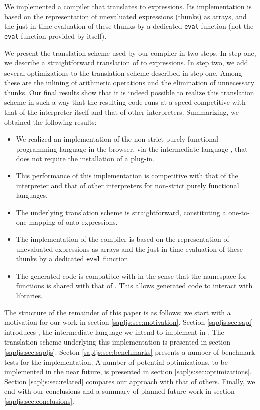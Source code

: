 We implemented a compiler that translates \Sapl to \JS expressions. Its
implementation is based on the representation of unevaluated expressions
(thunks) as \JS arrays, and the just-in-time evaluation of these thunks by a
dedicated \texttt{eval} function (not the \texttt{eval}
function provided by \JS itself).

We present the translation scheme used by our compiler in two steps.
In step one, we describe a straightforward translation of \Sapl to \JS
expressions. In step two, we add several optimizations to the translation
scheme described in step one. Among these are the inlining of arithmetic
operations and the elimination of unnecessary thunks. Our final results show
that it is indeed possible to realize this translation scheme in such a way that
the resulting code runs at a speed competitive with that of the \Sapl
interpreter itself and that of other interpreters. Summarizing, we obtained the
following results:

\begin{itemize}
\item We realized an implementation of the non-strict purely functional
      programming language \Clean in the browser, via the intermediate language       
      \Sapl, that does not require the installation of a plug-in.
\item This performance of this implementation is competitive with that of the
      \Sapl interpreter and that of other interpreters for non-strict purely
      functional languages.
\item The underlying translation scheme is straightforward, constituting a
      one-to-one mapping of \Sapl onto \JS expressions.
\item The implementation of the compiler is based on the representation of
      unevaluated expressions as \JS arrays and the just-in-time evaluation of
      these thunks by a dedicated \texttt{eval} function.
\item The generated code is compatible with \JS in the sense that the namespace
      for functions is shared with that of \JS. This allows generated code to
      interact with \JS libraries.
\end{itemize}
The structure of the remainder of this paper is as follows: we start with a
motivation for our work in section \ref{sapljs:sec:motivation}. Section
\ref{sapljs:sec:sapl} introduces \Sapl, the intermediate language we intend to
implement in \JS. The translation scheme underlying this implementation is
presented in section \ref{sapljs:sec:sapljs}. Secton \ref{sapljs:sec:benchmarks}
presents a number of benchmark tests for the implementation. A number of
potential optimizations, to be implemented in the near future, is presented in
section \ref{sapljs:sec:optimizations}. Section \ref{sapljs:sec:related}
compares our approach with that of others. Finally, we end with our
conclusions and a summary of planned future work in section
\ref{sapljs:sec:conclusions}.

